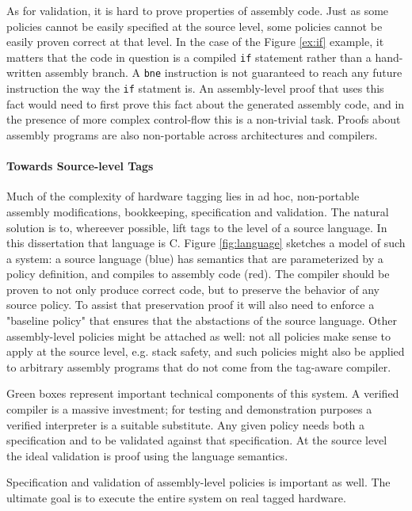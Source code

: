 \documentclass{report}
\begin{document}
As for validation, it is hard to prove properties of assembly code.
Just as some policies cannot be easily specified at the source level, some policies cannot be easily
proven correct at that level. In the case of the Figure \ref{ex:if} example, it matters that the code
in question is a compiled {\tt if} statement rather than a hand-written assembly branch. A {\tt bne}
instruction is not guaranteed to reach any future instruction the way the {\tt if} statment is. An
assembly-level proof that uses this fact would need to first prove this fact about the generated
assembly code, and in the presence of more complex control-flow this is a non-trivial task.
Proofs about assembly programs are also non-portable across architectures and compilers.

\paragraph{Towards Source-level Tags}

Much of the complexity of hardware tagging lies in ad hoc, non-portable assembly modifications,
bookkeeping, specification and validation. The natural solution is to, whereever possible, lift
tags to the level of a source language. In this dissertation that language is C. Figure \ref{fig:language}
sketches a model of such a system: a source language (blue) has semantics that are parameterized
by a policy definition, and compiles to assembly code (red). The compiler should be proven to not only
produce correct code, but to preserve the behavior of any source policy. To assist that preservation
proof it will also need to enforce a "baseline policy" that ensures that the abstactions of the
source language. Other assembly-level policies might be attached as well: not all policies make sense
to apply at the source level, e.g. stack safety, and such policies might also be applied to
arbitrary assembly programs that do not come from the tag-aware compiler.

Green boxes represent important technical components of this system. A verified compiler is a massive
investment; for testing and demonstration purposes a verified interpreter is a suitable substitute.
Any given policy needs both a specification and to be validated against that specification. At the
source level the ideal validation is proof using the language semantics.

Specification and validation of assembly-level policies is important as well. The ultimate goal
is to execute the entire system on real tagged hardware.
\end{document}
